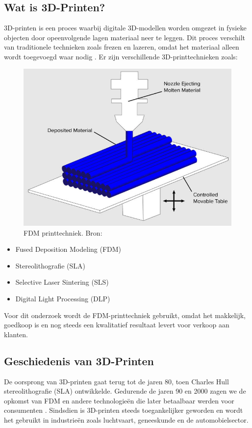 \subsection{Wat is 3D-Printen?}
3D-printen is een proces waarbij digitale 3D-modellen worden omgezet in fysieke objecten door opeenvolgende lagen materiaal neer te leggen. Dit proces verschilt van traditionele technieken zoals frezen en lazeren, omdat het materiaal alleen wordt toegevoegd waar nodig \autocite{3dPrintingIndustry}. Er zijn verschillende 3D-printtechnieken zoals:
\\
\begin{figure} %
    \centering
    \includegraphics[width=0.8\linewidth]{Foto's/FDM}
    \caption{FDM printtechniek. Bron:~\autocite{3dprintingImage}}
    \label{fig:fdm}
\end{figure}
\begin{itemize}
    \item Fused Deposition Modeling (FDM)
    \item Stereolithografie (SLA)
    \item Selective Laser Sintering (SLS)
    \item Digital Light Processing (DLP)
\end{itemize}
Voor dit onderzoek wordt de FDM-printtechniek gebruikt, omdat het makkelijk, goedkoop is en nog steeds een kwalitatief resultaat levert voor verkoop aan klanten.

\subsection{Geschiedenis van 3D-Printen}
De oorsprong van 3D-printen gaat terug tot de jaren 80, toen Charles Hull stereolithografie (SLA) ontwikkelde. Gedurende de jaren 90 en 2000 zagen we de opkomst van FDM en andere technologieën die later betaalbaar werden voor consumenten \autocite{3dPrintingIndustry}. Sindsdien is 3D-printen steeds toegankelijker geworden en wordt het gebruikt in industrieën zoals luchtvaart, geneeskunde en de automobielsector.

